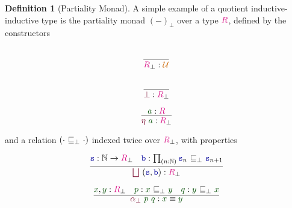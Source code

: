 \documentclass[twoside,11pt,openright]{report}
\theoremstyle{plain} %
\theoremstyle{definition}
\newtheorem{defn}[thm]{Definition}%
\theoremstyle{remark}
\newcommand*{\term}[1]{\textcolor{green!30!black}{#1}} %
\newcommand*{\type}[1]{\textcolor{magenta!90!black}{#1}}
\newcommand*{\universe}[1]{\textcolor{orange!80!black}{#1}}
\newcommand*{\relation}[1]{\textcolor{gray!75!black}{\ensuremath{\mathtt{#1}}}}
\newcommand*{\function}[1]{\textcolor{blue!60!black}{\ensuremath{\mathtt{#1}}}}
\newcommand*{\constructor}[1]{\textcolor{purple!60!black}{\ensuremath{\mathtt{#1}}}}
\begin{document}
\begin{defn}[Partiality Monad]
  A simple example of a quotient inductive-inductive type is the partiality monad \((-)_\bot\) over a type \(\type{R}\), defined by the constructors\\[-9mm]
  \begin{center}
    \begin{minipage}{0.25\linewidth}
      \begin{equation}
        \vcenter{\infer{\type{R}_\bot : \universe{\mathcal{U}}}{\strut}}
      \end{equation}
    \end{minipage}
    \hfill
    \begin{minipage}{0.25\linewidth}
      \begin{equation}
        \vcenter{\infer{\constructor{\bot} : \type{R}_\bot}{\strut}}
      \end{equation}
    \end{minipage}
    \hfill
    \begin{minipage}{0.25\linewidth}
      \begin{equation}
        \vcenter{\infer{\constructor{\eta}~\term{a} : \type{R}_\bot}{\term{a} : \type{R}}}
      \end{equation}
    \end{minipage}
  \end{center}
  and a relation \((\cdot~\relation{\sqsubseteq_{\bot}}~\cdot)\) indexed twice over \(\type{R}_\bot\), with properties\\[-9mm]
  \begin{center}
    \begin{minipage}{0.45\linewidth}
      \begin{equation}
        \vcenter{\infer{\constructor{\bigsqcup}~(\function{s},\function{b}) : \type{R}_\bot}{\function{s} : \mathbb{N} \rightarrow \type{R}_\bot & \function{b} : \prod_{(n : \mathbb{N})} \function{s}_n~\relation{\sqsubseteq_{\bot}}~\function{s}_{n+1} }}
      \end{equation}
    \end{minipage}
    \hfill
    \begin{minipage}{0.45\linewidth}
      \begin{equation}
        \vcenter{\infer{\constructor{\alpha_{\bot}}~\term{p}~\term{q} : \term{x} \equiv \term{y}}{\term{x},\term{y} : \type{R}_\bot & \term{p} : \term{x}~\relation{\sqsubseteq_{\bot}}~\term{y} & \term{q} : \term{y}~\relation{\sqsubseteq_{\bot}}~\term{x}}}
      \end{equation}

\end{minipage}
\end{center}
\end{defn}
\end{document}
